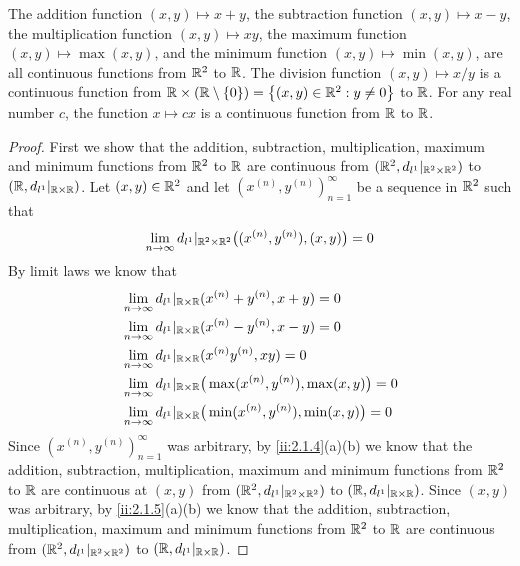 \begin{lem}\label{ii:2.2.2}
  The addition function \((x, y) \mapsto x + y\), the subtraction function \((x, y) \mapsto x - y\), the multiplication function \((x, y) \mapsto xy\), the maximum function \((x, y) \mapsto \max(x, y)\), and the minimum function \((x, y) \mapsto \min(x, y)\), are all continuous functions from \(\mathbb{R}^2\) to \(\mathbb{R}\).
  The division function \((x, y) \mapsto x / y\) is a continuous function from \(\mathbb{R} \times (\mathbb{R} \setminus \left\lbrace0\right\rbrace) = \left\lbrace(x, y) \in \mathbb{R}^2 : y \neq 0\right\rbrace\) to \(\mathbb{R}\).
  For any real number \(c\), the function \(x \mapsto cx\) is a continuous function from \(\mathbb{R}\) to \(\mathbb{R}\).
\end{lem}

\begin{proof}
  First we show that the addition, subtraction, multiplication, maximum and minimum functions from \(\mathbb{R}^2\) to \(\mathbb{R}\) are continuous from \((\mathbb{R}^2, d_{l^1}|_{\mathbb{R}^2 \times \mathbb{R}^2})\) to \((\mathbb{R}, d_{l^1}|_{\mathbb{R} \times \mathbb{R}})\).
  Let \((x, y) \in \mathbb{R}^2\) and let \((x^{(n)}, y^{(n)})_{n = 1}^\infty\) be a sequence in \(\mathbb{R}^2\) such that
  \[
    \lim_{n \to \infty} d_{l^1}|_{\mathbb{R}^2 \times \mathbb{R}^2}\big((x^{(n)}, y^{(n)}), (x, y)\big) = 0
  \]
  By limit laws we know that
  \begin{align*}
     & \lim_{n \to \infty} d_{l^1}|_{\mathbb{R} \times \mathbb{R}}(x^{(n)} + y^{(n)}, x + y) = 0                   \\
     & \lim_{n \to \infty} d_{l^1}|_{\mathbb{R} \times \mathbb{R}}(x^{(n)} - y^{(n)}, x - y) = 0                   \\
     & \lim_{n \to \infty} d_{l^1}|_{\mathbb{R} \times \mathbb{R}}(x^{(n)} y^{(n)}, xy) = 0                        \\
     & \lim_{n \to \infty} d_{l^1}|_{\mathbb{R} \times \mathbb{R}}\big(\max(x^{(n)}, y^{(n)}), \max(x, y)\big) = 0 \\
     & \lim_{n \to \infty} d_{l^1}|_{\mathbb{R} \times \mathbb{R}}\big(\min(x^{(n)}, y^{(n)}), \min(x, y)\big) = 0 \\
  \end{align*}
  Since \((x^{(n)}, y^{(n)})_{n = 1}^\infty\) was arbitrary, by \cref{ii:2.1.4}(a)(b) we know that the addition, subtraction, multiplication, maximum and minimum functions from \(\mathbb{R}^2\) to \(\mathbb{R}\) are continuous at \((x, y)\) from \((\mathbb{R}^2, d_{l^1}|_{\mathbb{R}^2 \times \mathbb{R}^2})\) to \((\mathbb{R}, d_{l^1}|_{\mathbb{R} \times \mathbb{R}})\).
  Since \((x, y)\) was arbitrary, by \cref{ii:2.1.5}(a)(b) we know that the addition, subtraction, multiplication, maximum and minimum functions from \(\mathbb{R}^2\) to \(\mathbb{R}\) are continuous from \((\mathbb{R}^2, d_{l^1}|_{\mathbb{R}^2 \times \mathbb{R}^2})\) to \((\mathbb{R}, d_{l^1}|_{\mathbb{R} \times \mathbb{R}})\).


\end{proof}
